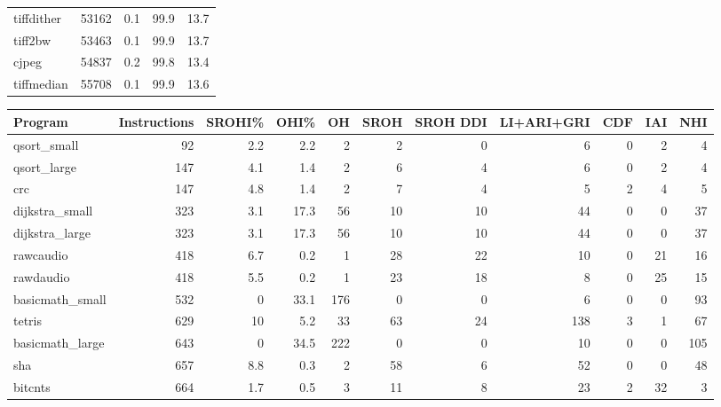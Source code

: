 \begin{tabular}{lrrrr}
 tiffdither      &   53162 &    0.1 &         99.9 &    13.7 \\
 tiff2bw         &   53463 &    0.1 &         99.9 &    13.7 \\
 cjpeg           &   54837 &    0.2 &         99.8 &    13.4 \\
 tiffmedian      &   55708 &    0.1 &         99.9 &    13.6 \\
\hline
\end{tabular}\begin{tabular}{lrrrrrrrrrr}
\hline
 Program         &   Instructions &   SROHI\% &   OHI\% &   OH &   SROH &   SROH DDI &   LI+ARI+GRI &   CDF &   IAI &   NHI \\
\hline
 qsort\_small     &             92 &      2.2 &    2.2 &    2 &      2 &          0 &            6 &     0 &     2 &     4 \\
 qsort\_large     &            147 &      4.1 &    1.4 &    2 &      6 &          4 &            6 &     0 &     2 &     4 \\
 crc             &            147 &      4.8 &    1.4 &    2 &      7 &          4 &            5 &     2 &     4 &     5 \\
 dijkstra\_small  &            323 &      3.1 &   17.3 &   56 &     10 &         10 &           44 &     0 &     0 &    37 \\
 dijkstra\_large  &            323 &      3.1 &   17.3 &   56 &     10 &         10 &           44 &     0 &     0 &    37 \\
 rawcaudio       &            418 &      6.7 &    0.2 &    1 &     28 &         22 &           10 &     0 &    21 &    16 \\
 rawdaudio       &            418 &      5.5 &    0.2 &    1 &     23 &         18 &            8 &     0 &    25 &    15 \\
 basicmath\_small &            532 &      0   &   33.1 &  176 &      0 &          0 &            6 &     0 &     0 &    93 \\
 tetris          &            629 &     10   &    5.2 &   33 &     63 &         24 &          138 &     3 &     1 &    67 \\
 basicmath\_large &            643 &      0   &   34.5 &  222 &      0 &          0 &           10 &     0 &     0 &   105 \\
 sha             &            657 &      8.8 &    0.3 &    2 &     58 &          6 &           52 &     0 &     0 &    48 \\
 bitcnts         &            664 &      1.7 &    0.5 &    3 &     11 &          8 &           23 &     2 &    32 &     3 \\

\end{tabular}
